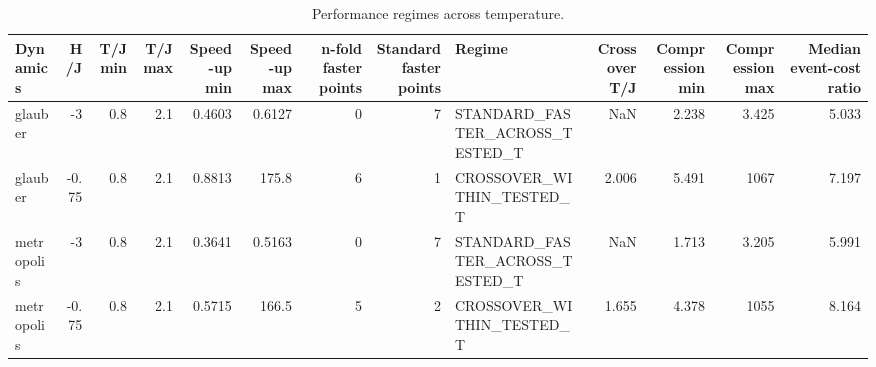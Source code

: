 \begin{table}
\caption{Performance regimes across temperature.}
\label{tab:temperature_performance}
\begin{tabular}{lrrrrrrrlrrrr}
\toprule
Dynamics & H/J & T/J min & T/J max & Speed-up min & Speed-up max & n-fold faster points & Standard faster points & Regime & Crossover T/J & Compression min & Compression max & Median event-cost ratio \\
\midrule
glauber & -3 & 0.8 & 2.1 & 0.4603 & 0.6127 & 0 & 7 & STANDARD\_FASTER\_ACROSS\_TESTED\_T & NaN & 2.238 & 3.425 & 5.033 \\
glauber & -0.75 & 0.8 & 2.1 & 0.8813 & 175.8 & 6 & 1 & CROSSOVER\_WITHIN\_TESTED\_T & 2.006 & 5.491 & 1067 & 7.197 \\
metropolis & -3 & 0.8 & 2.1 & 0.3641 & 0.5163 & 0 & 7 & STANDARD\_FASTER\_ACROSS\_TESTED\_T & NaN & 1.713 & 3.205 & 5.991 \\
metropolis & -0.75 & 0.8 & 2.1 & 0.5715 & 166.5 & 5 & 2 & CROSSOVER\_WITHIN\_TESTED\_T & 1.655 & 4.378 & 1055 & 8.164 \\
\bottomrule
\end{tabular}
\end{table}
